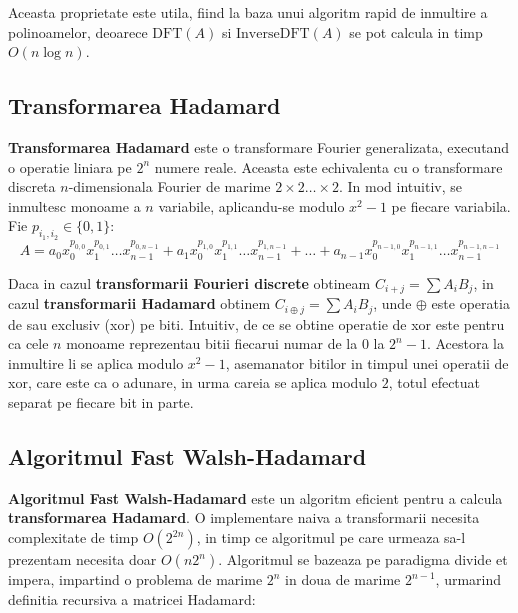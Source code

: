 Aceasta proprietate este utila, fiind la baza unui algoritm rapid de inmultire a
polinoamelor, deoarece $\text{DFT}(A)$ si $\text{InverseDFT}(A)$ se pot calcula
in timp $O(n \log n)$.

\subsection{Transformarea Hadamard}
\label{hadamard}

\textbf{Transformarea Hadamard} este o transformare Fourier generalizata,
executand o operatie liniara pe $2^{n}$ numere reale. Aceasta este echivalenta
cu o transformare discreta $n$-dimensionala Fourier de marime
$2 \times 2 \ldots \times 2$. In mod intuitiv, se inmultesc monoame a $n$
variabile, aplicandu-se modulo $x^{2}-1$ pe fiecare variabila. Fie $p_{i_{1}, i_{2}} \in \{0, 1\}$:
\begin{equation}
  A = a_{0} x_{0}^{p_{0, 0}} x_{1}^{p_{0, 1}} \ldots x_{n-1}^{p_{0, n-1}}
  + a_{1} x_{0}^{p_{1, 0}} x_{1}^{p_{1, 1}} \ldots x_{n-1}^{p_{1, n-1}}
  + \ldots
  + a_{n-1} x_{0}^{p_{n-1, 0}} x_{1}^{p_{n-1, 1}} \ldots x_{n-1}^{p_{n-1, n-1}}
\end{equation}

Daca in cazul \textbf{transformarii Fourieri discrete} obtineam
$C_{i+j} = \displaystyle\sum\limits A_{i} B_{j}$, in cazul \textbf{transformarii Hadamard} obtinem
$C_{i \oplus j} = \displaystyle\sum\limits A_{i} B_{j}$, unde $\oplus$ este operatia de sau exclusiv
(xor) pe biti. Intuitiv, de ce se obtine operatie de xor este pentru ca
cele $n$ monoame reprezentau bitii fiecarui numar de la $0$ la $2^{n} - 1$.
Acestora la inmultire li se aplica modulo $x^{2} - 1$, asemanator bitilor in
timpul unei operatii de xor, care este ca o adunare, in urma careia se aplica
modulo $2$, totul efectuat separat pe fiecare bit in parte.

\subsection{Algoritmul Fast Walsh-Hadamard}
\label{fasthadamard}

\textbf{Algoritmul Fast Walsh-Hadamard} este un algoritm eficient pentru a
calcula \textbf{transformarea Hadamard}. O implementare naiva a transformarii
necesita complexitate de timp $O(2^{2n})$, in timp ce algoritmul pe care urmeaza
sa-l prezentam necesita doar $O(n2^{n})$. Algoritmul se bazeaza pe paradigma
divide et impera, impartind o problema de marime $2^{n}$ in doua de marime
$2^{n-1}$, urmarind definitia recursiva a matricei Hadamard:

